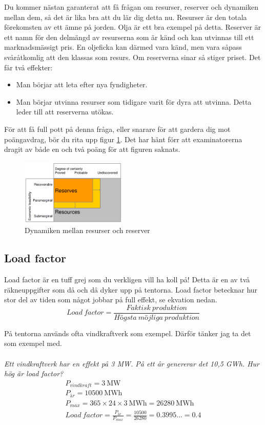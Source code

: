 \documentclass{article}
\begin{document}
Du kommer nästan garanterat att få frågan om resurser, reserver och dynamiken mellan dem, så det är lika bra att du lär dig detta nu. Resurser är den totala förekomsten av ett ämne på jorden. Olja är ett bra exempel på detta. Reserver är ett namn för den delmängd av resurserna som är känd och kan utvinnas till ett marknadsmässigt pris. En oljeficka kan därmed vara känd, men vara såpass svåråtkomlig att den klassas som resurs. Om reserverna sinar så stiger priset. Det får två effekter:
\begin{itemize}
    \item Man börjar att leta efter nya fyndigheter.
    \item Man börjar utvinna resurser som tidigare varit för dyra att utvinna. Detta leder till att reserverna utökas.
\end{itemize}
För att få full pott på denna fråga, eller snarare för att gardera dig mot poängavdrag, bör du rita upp figur \ref{fig:reservresurs}. Det har hänt förr att examinatorerna dragit av både en och två poäng för att figuren saknats.
\begin{figure}[!ht]
    \centering
    \includegraphics[width=50mm]{resurs.png}
    \caption{Dynamiken mellan resurser och reserver}
    \label{fig:reservresurs}
\end{figure}

\subsection{Load factor}
Load factor är en tuff grej som du verkligen vill ha koll på! Detta är en av två räkneuppgifter som då och då dyker upp på tentorna. Load factor betecknar hur stor del av tiden som något jobbar på full effekt, se ekvation nedan.\\
\begin{equation}
Load~factor = \frac{Faktisk~produktion}{Högsta~möjliga~produktion}
\end{equation}


På tentorna används ofta vindkraftverk som exempel. Därför tänker jag ta det som exempel med.\\
\\
\textit{Ett vindkraftverk har en effekt på 3 MW. På ett år genererar det 10,5 GWh. Hur hög är load factor?}
\begin{equation}
\begin{aligned}
    P_{vindkraft} = \SI{3}{\mega\watt}\\
    P_{år} = \SI{10500}{\mega\watt\hour}\\
    P_{max} = 365 \times 24 \times \SI{3}{\mega\watt\hour} = \SI{26280}{\mega\watt\hour}\\
    Load~factor = \frac{P_{år}}{P_{max}} = \frac{10500}{26280} = 0.3995... = 0.4\\
\end{aligned}
\end{equation}
\end{document}
